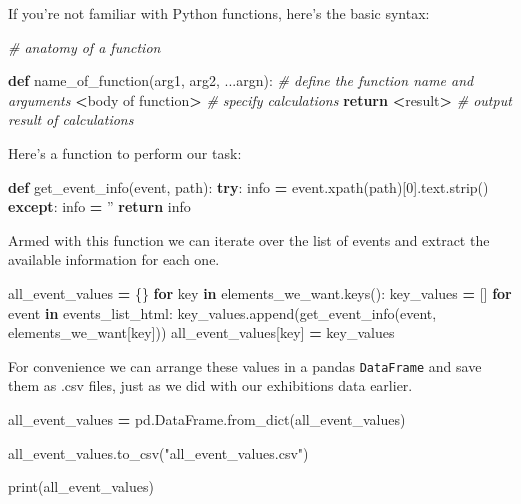 \documentclass[]{book}
\newenvironment{Shaded}{\begin{snugshade}}{\end{snugshade}}
\newcommand{\KeywordTok}[1]{\textcolor[rgb]{0.13,0.29,0.53}{\textbf{#1}}}
\newcommand{\DecValTok}[1]{\textcolor[rgb]{0.00,0.00,0.81}{#1}}
\newcommand{\StringTok}[1]{\textcolor[rgb]{0.31,0.60,0.02}{#1}}
\newcommand{\CommentTok}[1]{\textcolor[rgb]{0.56,0.35,0.01}{\textit{#1}}}
\newcommand{\ControlFlowTok}[1]{\textcolor[rgb]{0.13,0.29,0.53}{\textbf{#1}}}
\newcommand{\OperatorTok}[1]{\textcolor[rgb]{0.81,0.36,0.00}{\textbf{#1}}}
\newcommand{\BuiltInTok}[1]{#1}
\newcommand{\NormalTok}[1]{#1}
\begin{document}
If you're not familiar with Python functions, here's the basic syntax:

\begin{Shaded}
\begin{Highlighting}[]
\CommentTok{# anatomy of a function}

\KeywordTok{def}\NormalTok{ name_of_function(arg1, arg2, ...argn):  }\CommentTok{# define the function name and arguments}
    \OperatorTok{<}\NormalTok{body of function}\OperatorTok{>}   \CommentTok{# specify calculations}
    \ControlFlowTok{return} \OperatorTok{<}\NormalTok{result}\OperatorTok{>}      \CommentTok{# output result of calculations}
\end{Highlighting}
\end{Shaded}

Here's a function to perform our task:

\begin{Shaded}
\begin{Highlighting}[]
\KeywordTok{def}\NormalTok{ get_event_info(event, path):}
    \ControlFlowTok{try}\NormalTok{:}
\NormalTok{        info }\OperatorTok{=}\NormalTok{ event.xpath(path)[}\DecValTok{0}\NormalTok{].text.strip()}
    \ControlFlowTok{except}\NormalTok{:}
\NormalTok{        info }\OperatorTok{=} \StringTok{''}
    \ControlFlowTok{return}\NormalTok{ info}
\end{Highlighting}
\end{Shaded}

Armed with this function we can iterate over the list of events and
extract the available information for each one.

\begin{Shaded}
\begin{Highlighting}[]
\NormalTok{all_event_values }\OperatorTok{=}\NormalTok{ \{\}}
\ControlFlowTok{for}\NormalTok{ key }\KeywordTok{in}\NormalTok{ elements_we_want.keys():}
\NormalTok{    key_values }\OperatorTok{=}\NormalTok{ []}
    \ControlFlowTok{for}\NormalTok{ event }\KeywordTok{in}\NormalTok{ events_list_html: }
\NormalTok{        key_values.append(get_event_info(event, elements_we_want[key]))}
\NormalTok{    all_event_values[key] }\OperatorTok{=}\NormalTok{ key_values}
\end{Highlighting}
\end{Shaded}

For convenience we can arrange these values in a pandas
\texttt{DataFrame} and save them as .csv files, just as we did with our
exhibitions data earlier.

\begin{Shaded}
\begin{Highlighting}[]
\NormalTok{all_event_values }\OperatorTok{=}\NormalTok{ pd.DataFrame.from_dict(all_event_values)}

\NormalTok{all_event_values.to_csv(}\StringTok{"all_event_values.csv"}\NormalTok{)}

\BuiltInTok{print}\NormalTok{(all_event_values)}
\end{Highlighting}
\end{Shaded}
\end{document}
